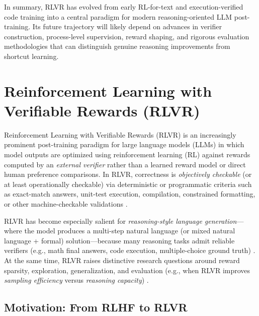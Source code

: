\documentclass[10pt]{article}
\begin{document}
In summary, RLVR has evolved from early RL-for-text and execution-verified code training into a central paradigm for modern reasoning-oriented LLM post-training. Its future trajectory will likely depend on advances in verifier construction, process-level supervision, reward shaping, and rigorous evaluation methodologies that can distinguish genuine reasoning improvements from shortcut learning.




\section{Reinforcement Learning with Verifiable Rewards (RLVR)}
\label{sec:rlvr}

Reinforcement Learning with Verifiable Rewards (RLVR) is an increasingly prominent post-training paradigm for large language models (LLMs) in which model outputs are optimized using reinforcement learning (RL) against rewards computed by an \emph{external verifier} rather than a learned reward model or direct human preference comparisons.
In RLVR, correctness is \emph{objectively checkable} (or at least operationally checkable) via deterministic or programmatic criteria such as exact-match answers, unit-test execution, compilation, constrained formatting, or other machine-checkable validations \cite{guo2025deepseekr1,deepseekai2024deepseekmath,wen2025rlvr}.

RLVR has become especially salient for \emph{reasoning-style language generation}---where the model produces a multi-step natural language (or mixed natural language + formal) solution---because many reasoning tasks admit reliable verifiers (e.g., math final answers, code execution, multiple-choice ground truth) \cite{guo2025deepseekr1,wen2025rlvr,zhang2025medrlvr}.
At the same time, RLVR raises distinctive research questions around reward sparsity, exploration, generalization, and evaluation (e.g., when RLVR improves \emph{sampling efficiency} versus \emph{reasoning capacity}) \cite{wen2025rlvr,mroueh2025grpo}.

\subsection{Motivation: From RLHF to RLVR}
\end{document}
